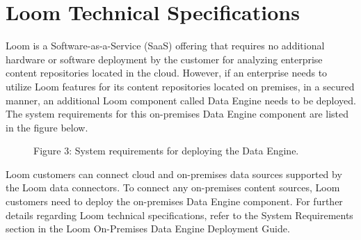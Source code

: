 \documentclass[letterpaper,10pt,english]{sphinxhowto}
\begin{document}
\section{Loom Technical Specifications}
\label{\detokenize{col/ds/mcdmp_ds_alpha2:loom-technical-specifications}}
Loom is a Software-as-a-Service (SaaS) offering that requires no additional hardware or software deployment by the customer for analyzing enterprise content repositories located in the cloud.  However, if an enterprise needs to utilize Loom features for its content repositories located on premises, in a secured manner, an additional Loom component called Data Engine needs to be deployed. The system requirements for this on-premises Data Engine component are listed in the figure below.

\begin{figure}[htbp]
\centering
\capstart

\noindent{}
\caption{Figure 3: System requirements for deploying the Data Engine.}\label{\detokenize{col/ds/mcdmp_ds_alpha2:id5}}\end{figure}

Loom customers can connect cloud and on-premises data sources supported by the Loom data connectors. To connect any on-premises content sources, Loom customers need to deploy the on-premises Data Engine component.
For further details regarding Loom technical specifications, refer to the System Requirements section in the Loom On-Premises Data Engine Deployment Guide.




\renewcommand{\indexname}{Index}
\printindex
\end{document}
